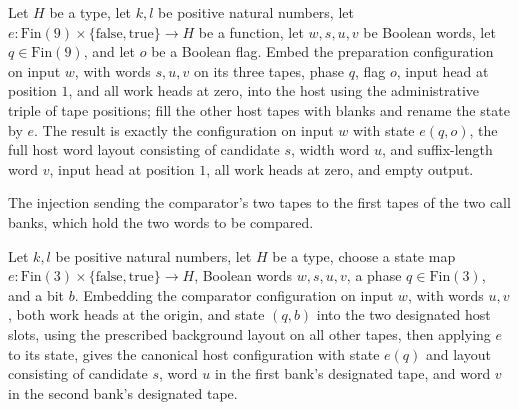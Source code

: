 \begin{lemma}
\label{Turing.FinTM.emitterP2_small_frame}
\leanok
{}
Let $H$ be a type, let $k,l$ be positive natural numbers, let
$e:\mathrm{Fin}(9)\times\{\mathrm{false},\mathrm{true}\}\to H$ be a function, let
$w,s,u,v$ be Boolean words, let $q\in\mathrm{Fin}(9)$, and let $o$ be a Boolean flag.
Embed the preparation configuration on input $w$, with words $s,u,v$ on its three tapes,
phase $q$, flag $o$, input head at position $1$, and all work heads at zero, into the
host using the administrative triple of tape positions; fill the other host tapes with
blanks and rename the state by $e$. The result is exactly the configuration on input $w$
with state $e(q,o)$, the full host word layout consisting of candidate $s$, width word
$u$, and suffix-length word $v$, input head at position $1$, all work heads at zero, and
empty output.
\end{lemma}

\begin{definition}
\label{Turing.FinTM.emitterP2PairIndex}
\leanok
{}
The injection sending the comparator's two tapes to the first tapes of the
two call banks, which hold the two words to be compared.
\end{definition}

\begin{lemma}
\label{Turing.FinTM.emitterP2_pair_frame}
\leanok
{}
Let $k,l$ be positive natural numbers, let $H$ be a type, choose a state map
$e:\text{Fin}(3)\times\{\mathrm{false},\mathrm{true}\}\to H$, Boolean words $w,s,u,v$, a
phase $q\in\text{Fin}(3)$, and a bit $b$. Embedding the comparator configuration on
input $w$, with words $u,v$, both work heads at the origin, and state $(q,b)$ into the
two designated host slots, using the prescribed background layout on all other tapes,
then applying $e$ to its state, gives the canonical host configuration with state $e(q)$
and layout consisting of candidate $s$, word $u$ in the first bank's designated tape,
and word $v$ in the second bank's designated tape.
\end{lemma}

